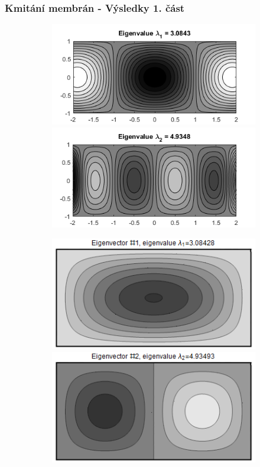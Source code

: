 \documentclass[xcolor=table]{beamer}
\begin{document}
\begin{frame}
\frametitle{Kmitání membrán - Výsledky 1. část}

\begin{figure}
\centering
\begin{subfigure}{.5\textwidth}
\centering
\includegraphics[width=1\linewidth]{obdelnicky11.png}
\includegraphics[width=1\linewidth]{obdelnicky12.png}
\end{subfigure}%
\begin{subfigure}{.5\textwidth}
\centering
\includegraphics[width=.95\linewidth]{rectangle-eigenvector-1.png}
\includegraphics[width=.95\linewidth]{rectangle-eigenvector-2.png}

\end{subfigure}
\end{figure}
\end{frame}
\end{document}

